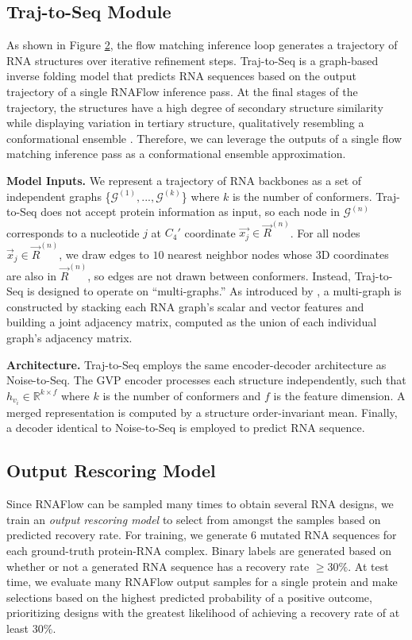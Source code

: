 \subsection{Traj-to-Seq Module}
\label{sec:3.3}

As shown in Figure \hyperref[fig:2]{2}, the flow matching inference loop generates a trajectory of RNA structures over iterative refinement steps. Traj-to-Seq is a graph-based inverse folding model that predicts RNA sequences based on the output trajectory of a single RNAFlow inference pass. At the final stages of the trajectory, the structures have a high degree of secondary structure similarity while displaying variation in tertiary structure, qualitatively resembling a conformational ensemble \cite{fornili2013specialized}. Therefore, we can leverage the outputs of a single flow matching inference pass as a conformational ensemble approximation.

\textbf{Model Inputs.} We represent a trajectory of RNA backbones as a set of independent graphs  \{$\mathcal{G}^{(1)}, ..., \mathcal{G}^{(k)}$\} where $k$ is the number of conformers. Traj-to-Seq does not accept protein information as input, so each node in $\mathcal{G}^{(n)}$ corresponds to a nucleotide $j$ at $C_{4}'$ coordinate $\vec{x_j} \in \vec R^{(n)}$. For all nodes $\vec{x}_j \in \vec R^{(n)}$, we draw edges to $10$ nearest neighbor nodes whose 3D coordinates are also in $\vec R^{(n)}$, so edges are not drawn between conformers. Instead, Traj-to-Seq is designed to operate on ``multi-graphs.'' As introduced by \citet{joshi2023multi}, a multi-graph is constructed by stacking each RNA graph's scalar and vector features and building a joint adjacency matrix, computed as the union of each individual graph's adjacency matrix.

\textbf{Architecture.} Traj-to-Seq employs the same encoder-decoder architecture as Noise-to-Seq. The GVP encoder processes each structure independently, such that $h_{v_i} \in \mathbb{R}^{k \times f}$ where $k$ is the number of conformers and $f$ is the feature dimension. A merged representation is computed by a structure order-invariant mean. Finally, a decoder identical to Noise-to-Seq is employed to predict RNA sequence. 

\subsection{Output Rescoring Model}

Since RNAFlow can be sampled many times to obtain several RNA designs, we train an \textit{output rescoring model} to select from amongst the samples based on predicted recovery rate. For training, we generate 6 mutated RNA sequences for each ground-truth protein-RNA complex. Binary labels are generated based on whether or not a generated RNA sequence has a recovery rate $\geq 30\%$. At test time, we evaluate many RNAFlow output samples for a single protein and make selections based on the highest predicted probability of a positive outcome, prioritizing designs with the greatest likelihood of achieving a recovery rate of at least $30\%$.

